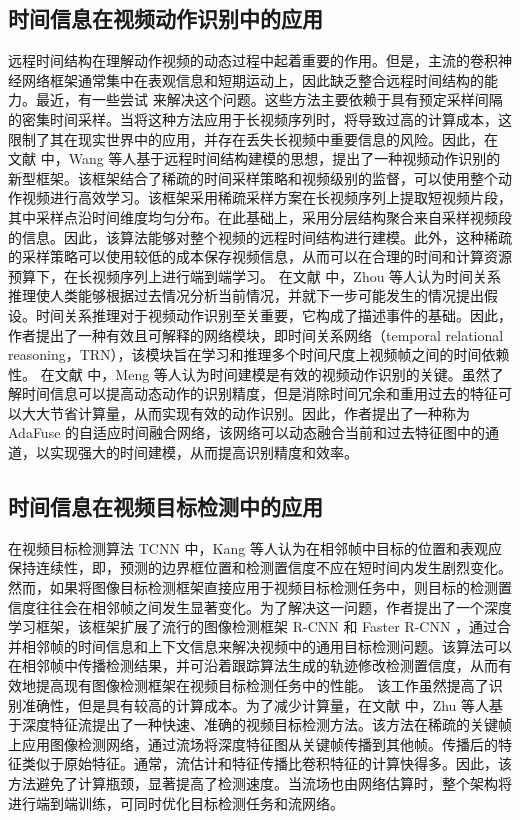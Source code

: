 \subsection{时间信息在视频动作识别中的应用}
远程时间结构在理解动作视频的动态过程中起着重要的作用。但是，主流的卷积神经网络框架通常集中在表观信息和短期运动上，因此缺乏整合远程时间结构的能力。最近，有一些尝试 \cite{Motionlets} 来解决这个问题。这些方法主要依赖于具有预定采样间隔的密集时间采样。当将这种方法应用于长视频序列时，将导致过高的计算成本，这限制了其在现实世界中的应用，并存在丢失长视频中重要信息的风险。因此，在 文献 \cite{TSN} 中，Wang 等人基于远程时间结构建模的思想，提出了一种视频动作识别的新型框架。该框架结合了稀疏的时间采样策略和视频级别的监督，可以使用整个动作视频进行高效学习。该框架采用稀疏采样方案在长视频序列上提取短视频片段，其中采样点沿时间维度均匀分布。在此基础上，采用分层结构聚合来自采样视频段的信息。因此，该算法能够对整个视频的远程时间结构进行建模。此外，这种稀疏的采样策略可以使用较低的成本保存视频信息，从而可以在合理的时间和计算资源预算下，在长视频序列上进行端到端学习。%
在文献 \cite{TRN} 中，Zhou 等人认为时间关系推理使人类能够根据过去情况分析当前情况，并就下一步可能发生的情况提出假设。时间关系推理对于视频动作识别至关重要，它构成了描述事件的基础。因此，作者提出了一种有效且可解释的网络模块，即时间关系网络（temporal relational reasoning，TRN），该模块旨在学习和推理多个时间尺度上视频帧之间的时间依赖性。%
在文献 \cite{AdaFuse} 中，Meng 等人认为时间建模是有效的视频动作识别的关键。虽然了解时间信息可以提高动态动作的识别精度，但是消除时间冗余和重用过去的特征可以大大节省计算量，从而实现有效的动作识别。因此，作者提出了一种称为 AdaFuse 的自适应时间融合网络，该网络可以动态融合当前和过去特征图中的通道，以实现强大的时间建模，从而提高识别精度和效率。%
\subsection{时间信息在视频目标检测中的应用}
在视频目标检测算法 TCNN \cite{TCNN} 中，Kang 等人认为在相邻帧中目标的位置和表观应保持连续性，即，预测的边界框位置和检测置信度不应在短时间内发生剧烈变化。然而，如果将图像目标检测框架直接应用于视频目标检测任务中，则目标的检测置信度往往会在相邻帧之间发生显著变化。为了解决这一问题，作者提出了一个深度学习框架，该框架扩展了流行的图像检测框架 R-CNN \cite{girshick2014rich} 和 Faster R-CNN \cite{ren2015faster}，通过合并相邻帧的时间信息和上下文信息来解决视频中的通用目标检测问题。该算法可以在相邻帧中传播检测结果，并可沿着跟踪算法生成的轨迹修改检测置信度，从而有效地提高现有图像检测框架在视频目标检测任务中的性能。%
该工作虽然提高了识别准确性，但是具有较高的计算成本。为了减少计算量，在文献 \cite{DeepFeature} 中，Zhu 等人基于深度特征流提出了一种快速、准确的视频目标检测方法。该方法在稀疏的关键帧上应用图像检测网络，通过流场将深度特征图从关键帧传播到其他帧。传播后的特征类似于原始特征。通常，流估计和特征传播比卷积特征的计算快得多。因此，该方法避免了计算瓶颈，显著提高了检测速度。当流场也由网络估算时，整个架构将进行端到端训练，可同时优化目标检测任务和流网络。%
